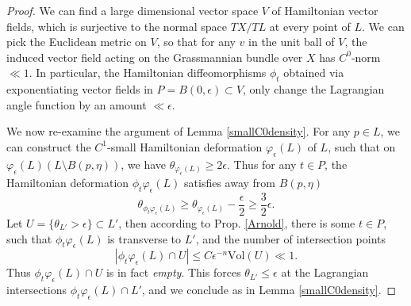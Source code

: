 \documentclass[a4paper]{article}
\theoremstyle{definition}
\newtheorem{cor}[thm]{Corollary}
\begin{document}
\begin{proof}
We can find a large dimensional vector space $V$ of Hamiltonian vector fields, which is surjective to the normal space $TX/TL$ at every point of $L$. We can pick the Euclidean metric on $V$, so that for any $v$ in the unit ball of $V$, the induced vector field acting on the Grassmannian bundle over $X$ has $C^0$-norm $\ll 1$. In particular, the Hamiltonian diffeomorphisms $\phi_t$ obtained via exponentiating vector fields in $ P=B(0,\epsilon)\subset V$, only change the Lagrangian angle function by an amount $\ll \epsilon$. 





We now re-examine the argument of Lemma \ref{smallC0density}. For any $p\in L$, we can construct the $C^1$-small Hamiltonian deformation $\varphi_\epsilon(L)$ of $L$, such that on $\varphi_\epsilon(L)(L\setminus B(p,\eta))$, we have $\theta_{\varphi_\epsilon(L)}\geq 2\epsilon$. Thus for any $t\in P$, the Hamiltonian deformation $\phi_t\varphi_\epsilon(L)$ satisfies away from $B(p,\eta)$
\[
\theta_{\phi_t\varphi_\epsilon(L)} \geq \theta_{\varphi_\epsilon(L)}- \frac{\epsilon}{2} \geq \frac{3}{2}\epsilon.
\] 
Let $U=\{  \theta_{L'}> \epsilon   \}\subset L'$, then according to Prop. \ref{Arnold}, there is some $t\in P$, such that $\phi_t\varphi_\epsilon(L)$ is transverse to $L'$, and the number of intersection points
\[
|\phi_t\varphi_\epsilon(L)\cap U| \leq C\epsilon^{-n} \text{Vol}(  U ) \ll 1. 
\]
Thus $\phi_t\varphi_\epsilon(L)\cap U$ is in fact \emph{empty}. This forces $\theta_{L'}\leq \epsilon$ at the Lagrangian intersections $\phi_t\varphi_\epsilon(L)\cap L'$, and we conclude as in Lemma \ref{smallC0density}.
\end{proof}






\end{document}
